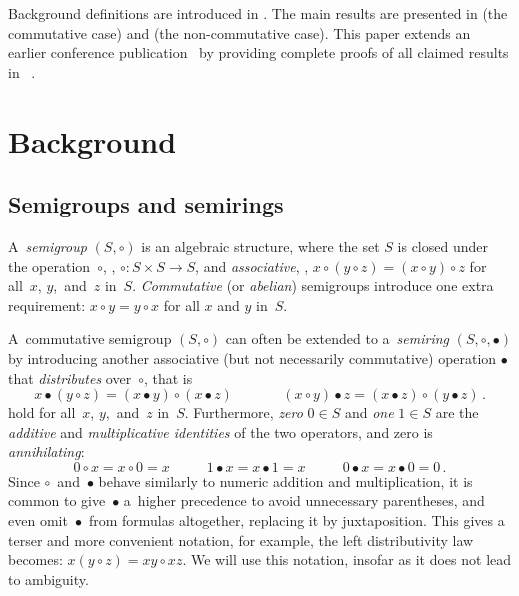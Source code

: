 \documentclass{toc}
\begin{document}
Background definitions are introduced in . The main
results are presented in  (the commutative case)
and  (the non-commutative case).
This paper extends an earlier conference publication~\cite{conf-version}
by providing complete proofs of all claimed results in
~.

\section{Background} \label{sec:background}

\subsection{Semigroups and semirings}
A~\emph{semigroup} $(S, \circ)$ is an algebraic structure, where
the set $S$ is closed under the operation~$\circ$,
\ie, $\circ : S\times S \rightarrow S$,
and
\emph{associative}, \ie,
$x \circ (y \circ z) = (x \circ y) \circ z$ for all~$x$, $y$,~and~$z$
in~$S$.
\emph{Commutative} (or \emph{abelian}) semigroups introduce
one extra requirement: $x \circ y = y \circ x$ for all $x$ and $y$
in~$S$.

A~commutative semigroup $(S, \circ)$ can often be extended to
a~\emph{semiring} $(S, \circ, \bullet)$ by introducing
another associative (but not necessarily commutative)
operation $\bullet$ that \emph{distributes} over~$\circ$, that is
\[
x \bullet (y \circ z) = (x \bullet y) \circ (x \bullet z)~~~~~~~~~~~~~~~~(x \circ y) \bullet z = (x \bullet z) \circ (y \bullet z)\,.
\]
hold for all~$x$, $y$,~and~$z$ in~$S$.
Furthermore, \emph{zero} $0 \in S$ and \emph{one} $1 \in S$ are the
\emph{additive} and \emph{multiplicative identities} of the two operators,
and zero is \emph{annihilating}:
\[
0 \circ x = x \circ 0=x~~~~~~~~~~~~1 \bullet x = x \bullet 1 = x~~~~~~~~~~~~0 \bullet x = x \bullet 0 = 0\,.
\]
Since $\circ$~and~$\bullet$ behave
similarly to numeric addition and multiplication, it is common to
give~$\bullet$ a~higher precedence to avoid
unnecessary parentheses, and even omit~$\bullet$~from
formulas altogether, replacing it by juxtaposition.
This gives a terser and more convenient notation, for example, the left
distributivity law becomes: $x (y \circ z) = x y \circ x z$. We will use this
notation, insofar as it does not lead to ambiguity.
\end{document}
